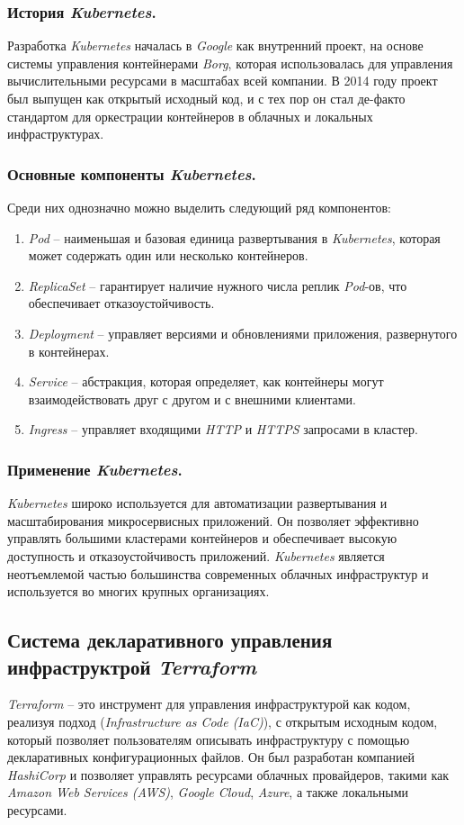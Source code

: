 \subsubsection{История \textit{Kubernetes}.}
Разработка \textit{Kubernetes} началась в \textit{Google} как внутренний проект, на основе системы управления контейнерами \textit{Borg}, которая использовалась для управления вычислительными ресурсами в масштабах всей компании. В 2014 году проект был выпущен как открытый исходный код, и с тех пор он стал де-факто стандартом для оркестрации контейнеров в облачных и локальных инфраструктурах.

\subsubsection{Основные компоненты \textit{Kubernetes}.} Среди них однозначно можно выделить следующий ряд компонентов:
\begin{enumerate}
    \item \textit{Pod} -- наименьшая и базовая единица развертывания в \textit{Kubernetes}, которая может содержать один или несколько контейнеров.
    \item \textit{ReplicaSet} -- гарантирует наличие нужного числа реплик \textit{Pod}-ов, что обеспечивает отказоустойчивость.
    \item \textit{Deployment} -- управляет версиями и обновлениями приложения, развернутого в контейнерах.
    \item \textit{Service} -- абстракция, которая определяет, как контейнеры могут взаимодействовать друг с другом и с внешними клиентами.
    \item \textit{Ingress} -- управляет входящими \textit{HTTP} и \textit{HTTPS} запросами в кластер.
\end{enumerate}

\subsubsection{Применение \textit{Kubernetes}.}
\textit{Kubernetes} широко используется для автоматизации развертывания и масштабирования микросервисных приложений. Он позволяет эффективно управлять большими кластерами контейнеров и обеспечивает высокую доступность и отказоустойчивость приложений. \textit{Kubernetes} является неотъемлемой частью большинства современных облачных инфраструктур и используется во многих крупных организациях.

\subsection{Система декларативного управления инфраструктрой \textit{Terraform}}
\label{sec:terraform}
\textit{Terraform} -- это инструмент для управления инфраструктурой как кодом, реализуя подход (\textit{Infrastructure as Code (IaC)}), с открытым исходным кодом, который позволяет пользователям описывать инфраструктуру с помощью декларативных конфигурационных файлов. Он был разработан компанией \textit{HashiCorp} и позволяет управлять ресурсами облачных провайдеров, такими как \textit{Amazon Web Services (AWS)}, \textit{Google Cloud}, \textit{Azure}, а также локальными ресурсами.

